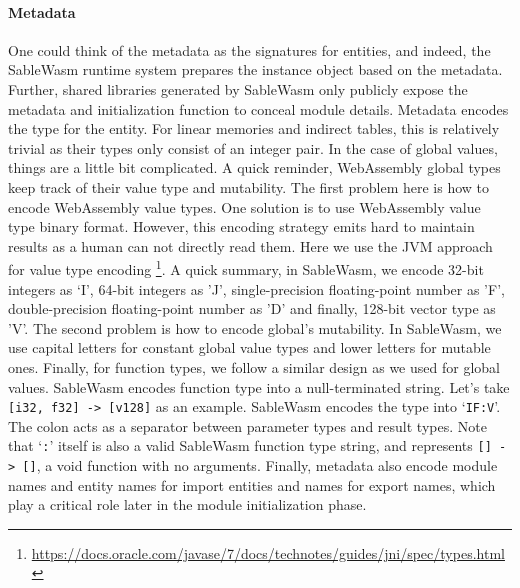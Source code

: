 \paragraph{Metadata}
One could think of the metadata as the signatures for entities, and indeed, the SableWasm runtime system prepares the instance object based on the metadata. Further, shared libraries generated by SableWasm only publicly expose the metadata and initialization function to conceal module details. Metadata encodes the type for the entity. For linear memories and indirect tables, this is relatively trivial as their types only consist of an integer pair. In the case of global values, things are a little bit complicated. A quick reminder, WebAssembly global types keep track of their value type and mutability. The first problem here is how to encode WebAssembly value types. One solution is to use WebAssembly value type binary format. However, this encoding strategy emits hard to maintain results as a human can not directly read them. Here we use the JVM approach for value type encoding \footnote{\url{https://docs.oracle.com/javase/7/docs/technotes/guides/jni/spec/types.html}}. A quick summary, in SableWasm, we encode 32-bit integers as `I', 64-bit integers as 'J', single-precision floating-point number as 'F', double-precision floating-point number as 'D' and finally, 128-bit vector type as 'V'. The second problem is how to encode global's mutability. In SableWasm, we use capital letters for constant global value types and lower letters for mutable ones. Finally, for function types, we follow a similar design as we used for global values. SableWasm encodes function type into a null-terminated string. Let's take \texttt{[i32, f32] -> [v128]} as an example. SableWasm encodes the type into `\texttt{IF:V}'. The colon acts as a separator between parameter types and result types. Note that `\texttt{:}' itself is also a valid SableWasm function type string, and represents \texttt{[] -> []}, a void function with no arguments. Finally, metadata also encode module names and entity names for import entities and names for export names, which play a critical role later in the module initialization phase.

